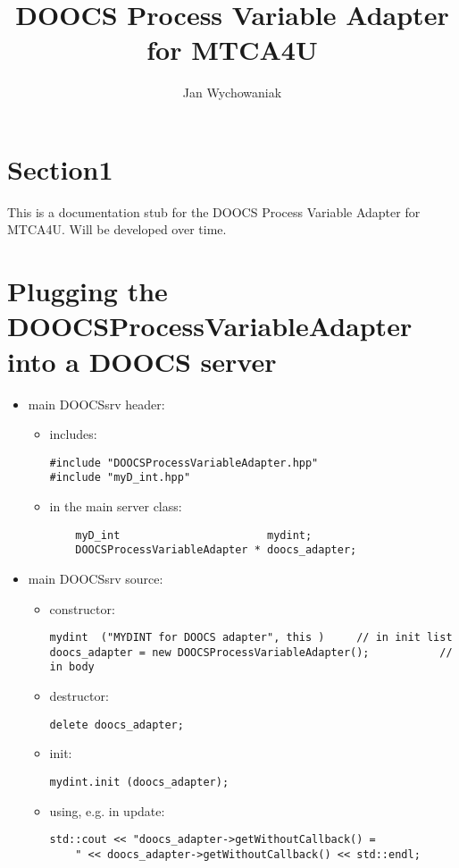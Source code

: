 \documentclass[11pt,a4paper]{scrartcl}
\title{DOOCS Process Variable Adapter for MTCA4U}
\author[1]{Jan Wychowaniak}
\affil[1]{TUL-DMCS, Lodz, Poland}
\begin{document}

\maketitle

\section{Section1}

This is a documentation stub for the DOOCS Process Variable Adapter for MTCA4U. Will be developed over time.

\newpage
\section{Plugging the DOOCSProcessVariableAdapter into a DOOCS server}

\begin{itemize}
  \item
    main DOOCSsrv header:
    \begin{itemize}
      \item
        includes:
\begin{verbatim}
#include "DOOCSProcessVariableAdapter.hpp"
#include "myD_int.hpp"
\end{verbatim}
      \item
        in the main server class:
\begin{verbatim}
	myD_int                       mydint; 
	DOOCSProcessVariableAdapter * doocs_adapter;
\end{verbatim}
    \end{itemize}
 
  \item
    main DOOCSsrv source: \par
    \begin{itemize}
      \item
        constructor:
\begin{verbatim}
mydint  ("MYDINT for DOOCS adapter", this )     // in init list
doocs_adapter = new DOOCSProcessVariableAdapter();           // in body
\end{verbatim}
      \item
        destructor:
\begin{verbatim}
delete doocs_adapter;
\end{verbatim}
      \item
        init:
\begin{verbatim}
mydint.init (doocs_adapter);
\end{verbatim}
      \item
        using, e.g. in update:
\begin{verbatim}
std::cout << "doocs_adapter->getWithoutCallback() =
    " << doocs_adapter->getWithoutCallback() << std::endl;
\end{verbatim}
    \end{itemize}
\end{itemize}
\end{document}
